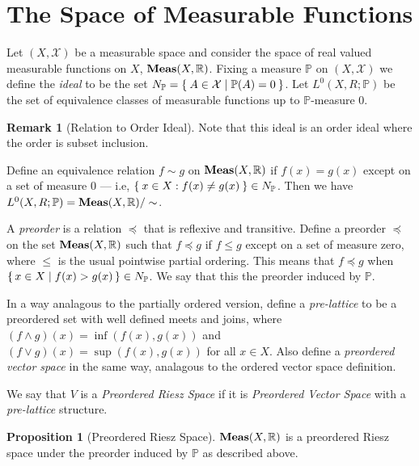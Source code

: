 \documentclass[letterpaper,10pt,oneside,onecolumn,reqno]{amsart}
\renewcommand{\P}{\mathbb P}
\newcommand{\R}{\mathbb R}
\newcommand{\X}{\mathcal X}
\theoremstyle{definition}
\newtheorem{pro}[thm]{Proposition}
\newtheorem{rem}{Remark}
\newcommand{\catname}[1]{{\normalfont\textbf{#1}}}
\newcommand{\Meas}{\catname{Meas}}
\newcommand{\meet}{\wedge}
\newcommand{\join}{\vee}
\begin{document}
\part{The Space of Measurable Functions}

Let $(X, \X)$ be a measurable space and consider the space of real
valued measurable functions on $X$, $\Meas(X,\R)$. Fixing a measure
$\P$ on $(X, \X)$ we define the \emph{ideal} to be the
set $N_\P = \Set{A \in \X | \P(A) = 0}$. Let $L^0(X,R;\P)$ be the set
of equivalence classes of measurable functions up to $\P$-measure 0.

\begin{rem}[Relation to Order Ideal]\label{rem:4}
  Note that this ideal is an order ideal where the order is subset
  inclusion.
\end{rem}

Define an equivalence relation $f \sim g$ on $\Meas(X, \R)$ if $f(x) =
g(x)$ except on a set of measure 0 --- i.e, $\Set{x \in X : f(x) \neq
  g(x)} \in N_\P$. Then we have $L^0(X,R;\P) = \Meas(X,\R) / \sim$.

A \emph{preorder} is a relation $\preceq $ that is
reflexive and transitive. Define a preorder $\preceq $ on the set
$\Meas(X,\R)$ such that $f \preceq g$ if $f \leq g$ except on a set of
measure zero, where $\leq $ is the usual pointwise partial
ordering. This means that $f \preceq g$ when $\set{x \in X | f(x) >
  g(x)} \in N_\P$. We say that this the preorder induced by $\P$.

In a way analagous to the partially ordered version, define a
\emph{pre-lattice} to be a preordered set with well
defined meets and joins, where $(f \meet g)(x) = \inf(f(x),g(x))$ and
$(f \join g)(x) = \sup(f(x),g(x))$ for all $x \in X$. Also define a
\emph{preordered vector space} in the
same way, analagous to the ordered vector space definition.

We say that $V$ is a \emph{Preordered
  Riesz Space} if it is \emph{Preordered Vector Space} with a
\emph{pre-lattice} structure.

\begin{pro}[Preordered Riesz Space]\label{pro:1}
  $\Meas(X, \R)$ is a preordered Riesz space under the preorder
  induced by $\P$ as described above.
\end{pro}
\end{document}
